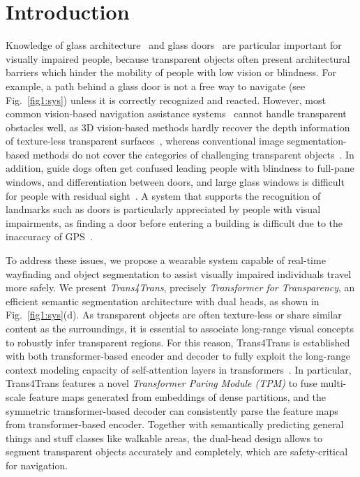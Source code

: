 \documentclass[10pt,twocolumn,letterpaper]{article}
\begin{document}
\section{Introduction}
Knowledge of glass architecture~\cite{butera2005glass} and glass doors~\cite{maringer2019suitability,mei2020don} are particular important for visually impaired people, because transparent objects often present architectural barriers which hinder the mobility of people with low vision or blindness. For example, a path behind a glass door is not a free way to navigate (see Fig.~\ref{fig1:sys}) unless it is correctly recognized and reacted. However, most common vision-based navigation assistance systems~\cite{aladren2014navigation,wang2017enabling,yang2017ir} cannot handle transparent obstacles well, as 3D vision-based methods hardly recover the depth information of texture-less transparent surfaces~\cite{aladren2014navigation,yang2017ir}, whereas conventional image segmentation-based methods do not cover the categories of challenging transparent objects~\cite{lin2019deep,yang2018unifying}. In addition, guide dogs often get confused leading people with blindness to full-pane windows, and differentiation between doors, and large glass windows is difficult for people with residual sight~\cite{saha2019wayfinding}.
A system that supports the recognition of landmarks such as doors is particularly appreciated by people with visual impairments, as finding a door before entering a building is difficult due to the inaccuracy of GPS~\cite{berenguel2020floor,saha2019wayfinding}.

To address these issues, we propose a wearable system capable of real-time wayfinding and object segmentation to assist visually impaired individuals travel more safely. We present \emph{Trans4Trans}, precisely \emph{Transformer for Transparency}, an efficient semantic segmentation architecture with dual heads, as shown in Fig.~\ref{fig1:sys}(d). As transparent objects are often texture-less or share similar content as the surroundings, it is essential to associate long-range visual concepts to robustly infer transparent regions. For this reason, Trans4Trans is established with both transformer-based encoder and decoder to fully exploit the long-range context modeling capacity of self-attention layers in transformers~\cite{vaswani2017attention}. In particular, Trans4Trans features a novel \emph{Transformer Paring Module (TPM)} to fuse multi-scale feature maps generated from embeddings of dense partitions, and the symmetric transformer-based decoder can consistently parse the feature maps from transformer-based encoder.
Together with semantically predicting general things and stuff classes like walkable areas, the dual-head design allows to segment transparent objects accurately and completely, which are safety-critical for navigation.
\end{document}
